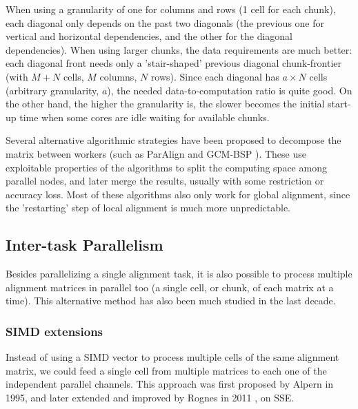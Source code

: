When using a granularity of one for columns and rows (1 cell for each chunk), each diagonal only depends on the past two diagonals (the previous one for vertical and horizontal dependencies, and the other for the diagonal dependencies). When using larger chunks, the data requirements are much better: each diagonal front needs only a 'stair-shaped' previous diagonal chunk-frontier (with $M+N$ cells, $M$ columns, $N$ rows). Since each diagonal has $a \times N$ cells (arbitrary granularity, $a$), the needed data-to-computation ratio is quite good. On the other hand, the higher the granularity is, the slower becomes the initial start-up time when some cores are idle waiting for available chunks.

Several alternative algorithmic strategies have been proposed to decompose the matrix between workers (such as ParAlign \cite{paralign} and GCM-BSP \cite{parbcp}). These use exploitable properties of the algorithms to split the computing space among parallel nodes, and later merge the results, usually with some restriction or accuracy loss. Most of these algorithms also only work for global alignment, since the 'restarting' step of local alignment is much more unpredictable.




\subsection{Inter-task Parallelism}
\label{Inter-task Parallelism}

Besides parallelizing a single alignment task, it is also possible to process multiple alignment matrices in parallel too (a single cell, or chunk, of each matrix at a time). This alternative method has also been much studied in the last decade.


\subsubsection{SIMD extensions}
\label{Rognes-section}

Instead of using a SIMD vector to process multiple cells of the same alignment matrix, we could feed a single cell from multiple matrices to each one of the independent parallel channels. This approach was first proposed by Alpern \cite{alpern} in 1995, and later extended and improved by Rognes in 2011 \cite{rognes2011}, on SSE.

